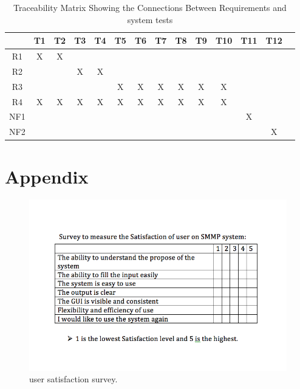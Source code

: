 \documentclass[12pt, titlepage]{article}
\begin{document}
\begin{table}[h!]
\centering
\begin{tabular}{|c|c|c|c|c|c|c|c|c|c|c|c|c|c|}
\hline
	& T1 & T2 & T3 & T4 & T5 & T6 & T7 &T8  & T9 & T10 & T11 & T12  \\
\hline
R1  & X& X& & & & & & &  & & &  \\ \hline
R2  & & & X& X& & & & &  & & &  \\ \hline
R3  & & & & &X &X&X & X &X &X & &  \\ \hline
R4  &X & X& X& X&X &X&X & X & X& X& & \\ \hline
NF1 & & & & & & & & &  & &X &  \\ \hline
NF2   & & & & & & & & &  & & & X  \\ \hline
\hline
\end{tabular}
\caption{Traceability Matrix Showing the Connections Between Requirements and system tests}
\label{tab:reqtrace}
\end{table}
\newpage




\newpage

\section{Appendix}
 \begin{figure}[h!]
 \begin{center}
 \includegraphics [width=\textwidth]{survey}
 \caption{\label{ Figure 1:} user satisfaction survey.}
 \end{center}
 \end{figure}
\end{document}
